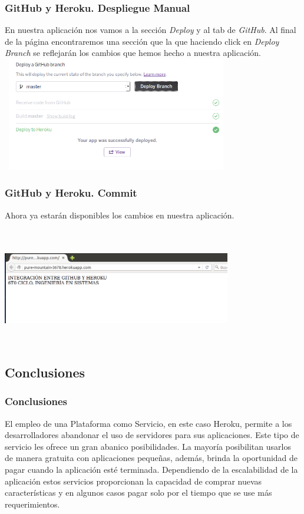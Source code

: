 \documentclass{beamer}
\begin{document}
\begin{frame}
\frametitle{GitHub y Heroku. Despliegue Manual}
En nuestra aplicación nos vamos a la sección \textit{Deploy} y al tab de \textit{GitHub}. Al final de la página encontraremos una sección que la que haciendo click en \textit{Deploy Branch} se reflejarán los cambios que hemos hecho a nuestra aplicación.\\
\centering
\includegraphics[width=10cm, height=5cm]{githubHeroku/30.png}
\end{frame}

\begin{frame}
\frametitle{GitHub y Heroku. Commit}
Ahora ya estarán disponibles los cambios en nuestra aplicación.\\ \ \\
\centering
\includegraphics[width=10cm, height=5cm]{githubHeroku/31.png}
\end{frame}

\subsection{Conclusiones}
\begin{frame}
\frametitle{Conclusiones}
El empleo de una Plataforma como Servicio, en este caso Heroku, permite a los desarrolladores abandonar el uso de servidores para sus aplicaciones. Este tipo de servicio les ofrece un gran abanico posibilidades. La mayoría posibilitan usarlos de manera gratuita con aplicaciones pequeñas, además, brinda la oportunidad de pagar cuando la aplicación esté terminada. Dependiendo de la escalabilidad de la aplicación estos servicios proporcionan la capacidad de comprar nuevas características y en algunos casos pagar solo por el tiempo que se use más requerimientos.

\end{frame}
\end{document}
